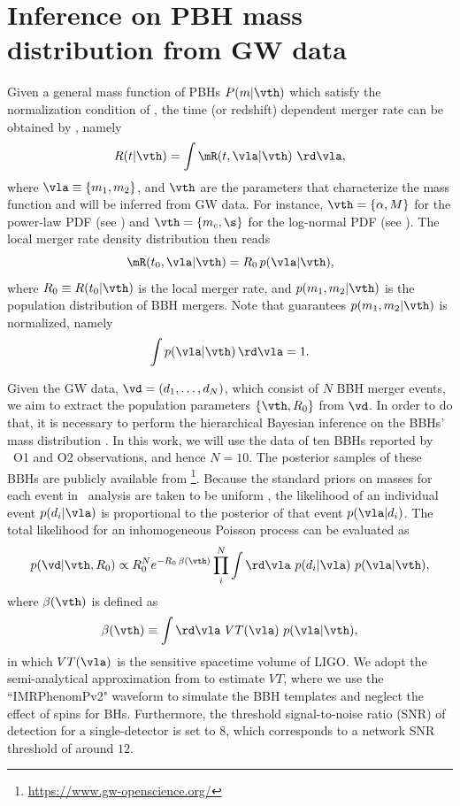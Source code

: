 \documentclass[twocolumn]{aastex631}
\def\e{\begin{equation}}
\def\q{\end{equation}}
\begin{document}
\section{\label{method}Inference on PBH mass distribution from GW data}
Given a general mass function of PBHs $P(m|\vth)$ which satisfy the normalization
condition of , the time (or redshift) dependent merger rate can be
obtained by , namely
\e\label{Rt2}
R(t|\vth) = \int \mR(t, \vla|\vth)\ \rd \vla,
\q 
where $\vla \equiv \{m_1, m_2\}$, and $\vth$ are the parameters that 
characterize the mass function and will be inferred from GW data. 
For instance, $\vth=\{\alpha, M\}$ for the power-law PDF (see ) 
and $\vth=\{m_c, \s\}$ for the log-normal PDF (see ).
The local merger rate density distribution then reads \cite{Chen:2018rzo}
\e\label{Rt0} 
\mR(t_0, \vla|\vth) = R_0\, p(\vla|\vth),
\q 
where $R_0 \equiv R(t_0|\vth)$ is the local merger rate, and $p(m_1,m_2|\vth)$ 
is the population distribution of BBH mergers.
Note that  guarantees $p(m_1,m_2|\vth)$ is normalized, namely
\e 
    \int p(\vla|\vth)\, \rd \vla = 1.
\q 

Given the GW data, $\vd = (d_1, \dots, d_N)$, which consist of $N$ BBH merger
events, we aim to extract the population parameters $\{\vth, R_0\}$ from $\vd$.
In order to do that, it is necessary to perform the hierarchical Bayesian inference
on the BBHs' mass distribution 
\cite{Abbott:2016nhf,Abbott:2016drs,TheLIGOScientific:2016pea,
    Wysocki:2018mpo,Fishbach:2018edt,Mandel:2018mve,Thrane:2018qnx}.
In this work, we will use the data of ten BBHs
\cite{TheLIGOScientific:2016pea,LIGOScientific:2018mvr} 
reported by \lvc\ O1 and O2 observations, and hence $N=10$. 
The posterior samples of these BBHs are publicly available from \footnote{\url{https://www.gw-openscience.org/}}. 
Because the standard priors on masses for each event in \lvc\ analysis are 
taken to be uniform \cite{TheLIGOScientific:2016pea,LIGOScientific:2018mvr},
the likelihood of an individual event $p(d_i|\vla)$ is
proportional to the posterior of that event $p(\vla|d_i)$.
The total likelihood for an inhomogeneous Poisson process can be evaluated as
\cite{Wysocki:2018mpo,Fishbach:2018edt,Mandel:2018mve,Thrane:2018qnx}
\e\label{likelihood}
p(\vd|\vth, R_0) \propto R_0^{N} e^{-R_0\, \beta(\vth)} \prod_i^N 
\int \rd\vla\ p(d_i|\vla)\ p(\vla|\vth),
\q 
where $\beta(\vth)$ is defined as
\e 
\beta(\vth) \equiv \int \rd\vla\ VT(\vla)\ p(\vla|\vth),
\q 
in which $VT(\vla)$ is the sensitive spacetime volume \cite{Abbott:2016nhf,Abbott:2016drs} of LIGO.
We adopt the semi-analytical approximation from 
\cite{Abbott:2016nhf,Abbott:2016drs} to estimate $VT$, 
where we use the ``IMRPhenomPv2" waveform to simulate the BBH templates
and neglect the effect of spins for BHs.
Furthermore, the threshold signal-to-noise ratio (SNR) of detection for a 
single-detector is set to $8$,
which corresponds to a network SNR threshold of around $12$.
\end{document}
